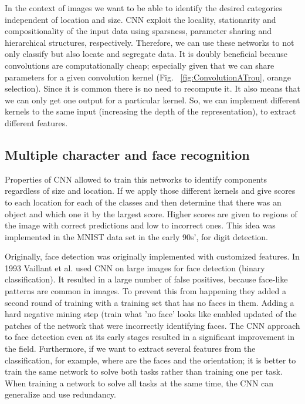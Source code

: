 \vspace{4mm}
\noindent
In the context of images we want to be able to identify the desired categories independent of location and size. CNN exploit the locality, stationarity and compositionality of the input data using sparsness, parameter sharing and hierarchical structures, respectively. Therefore, we can use these networks to not only classify but also locate and segregate data. It is doubly beneficial because convolutions are computationally cheap; especially given that we can share parameters for a given convolution kernel (Fig. ~\ref{fig:ConvolutionATrou}, orange selection). Since it is common there is no need to recompute it. It also means that we can only get one output for a particular kernel. So, we can implement different kernels to the same input (increasing the depth of the representation), to extract different features. 

\subsection{Multiple character and face recognition}
\noindent
Properties of CNN allowed to train this networks to identify components regardless of size and location. If we apply those different kernels and give scores to each location for each of the classes and then determine that there was an object and which one it by the largest score. Higher scores are given to regions of the image with correct predictions and low to incorrect ones. This idea was implemented in the MNIST data set in the early 90s', for digit detection.

\vspace{4mm}
\noindent
Originally, face detection was originally implemented with customized features. In 1993 Vaillant et al. used CNN on large images for face detection (binary classification). It resulted in a large number of false positives, because face-like patterns are common in images. To prevent this from happening they added a second round of training with a training set that has no faces in them. Adding a hard negative mining step (train what 'no face' looks like enabled updated of the patches of the network that were incorrectly identifying faces. The CNN approach to face detection even at its early stages resulted in a significant improvement in the field. Furthermore, if we want to extract several features from the classification, for example, where are the faces and the orientation; it is better to train the same network to solve both tasks rather than training one per task. When training a network to solve all tasks at the same time, the CNN can generalize and use redundancy.


